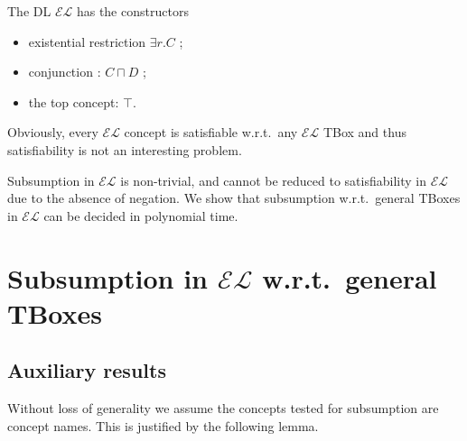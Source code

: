The DL $\mathcal{EL}$ has the constructors
\begin{itemize}
	\item existential restriction $\exists r.C$ ;
	\item conjunction : $C \sqcap D$ ;
	\item the top concept: $\top$.
\end{itemize}
Obviously, every $\mathcal{EL}$ concept is satisfiable w.r.t.\ any $\mathcal{EL}$ TBox
and thus satisfiability is not an interesting problem.

Subsumption in $\mathcal{EL}$ is non-trivial, and cannot be reduced to satisfiability in $\mathcal{EL}$ due to the absence of negation.
We show that subsumption w.r.t.\ general TBoxes in $\mathcal{EL}$ can be decided in polynomial time.

\section{Subsumption in $\mathcal{EL}$ w.r.t.\ general TBoxes}
\subsection{Auxiliary results}
Without loss of generality we assume the concepts tested for subsumption are concept names.
This is justified by the following lemma.

